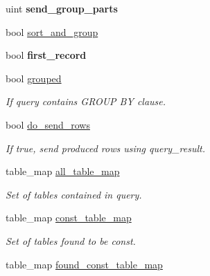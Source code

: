 \begin{DoxyCompactItemize}
\mbox{\label{classJOIN_a833e48fa5627d42fe968476e2a45e24b}} 
uint {\bfseries send\+\_\+group\+\_\+parts}
\item 
bool \mbox{\hyperlink{classJOIN_aa89b84b461352b7f0e5d5a8784235b7d}{sort\+\_\+and\+\_\+group}}
\item 
\mbox{\label{classJOIN_afc0a21771c3cb4c59685178ee005fdb7}} 
bool {\bfseries first\+\_\+record}
\item 
\mbox{\label{classJOIN_ae69fb3e1c9529b41c58c8add0f4feafc}} 
bool \mbox{\hyperlink{classJOIN_ae69fb3e1c9529b41c58c8add0f4feafc}{grouped}}
\begin{DoxyCompactList}\small\item\em If query contains G\+R\+O\+UP BY clause. \end{DoxyCompactList}\item 
\mbox{\label{classJOIN_ab6535fcc7539ddc69d5e66f208187ef2}} 
bool \mbox{\hyperlink{classJOIN_ab6535fcc7539ddc69d5e66f208187ef2}{do\+\_\+send\+\_\+rows}}
\begin{DoxyCompactList}\small\item\em If true, send produced rows using query\+\_\+result. \end{DoxyCompactList}\item 
\mbox{\label{classJOIN_aad8b0c458e076b6c42e4a49466af1d3e}} 
table\+\_\+map \mbox{\hyperlink{classJOIN_aad8b0c458e076b6c42e4a49466af1d3e}{all\+\_\+table\+\_\+map}}
\begin{DoxyCompactList}\small\item\em Set of tables contained in query. \end{DoxyCompactList}\item 
\mbox{\label{classJOIN_a3c5ac053e5f83bd9b05849feecc2bbed}} 
table\+\_\+map \mbox{\hyperlink{classJOIN_a3c5ac053e5f83bd9b05849feecc2bbed}{const\+\_\+table\+\_\+map}}
\begin{DoxyCompactList}\small\item\em Set of tables found to be const. \end{DoxyCompactList}\item 
table\+\_\+map \mbox{\hyperlink{classJOIN_a4d7b5537fed06b1b5cf1ba9c360748f2}{found\+\_\+const\+\_\+table\+\_\+map}}
\item 

\end{DoxyCompactItemize}
